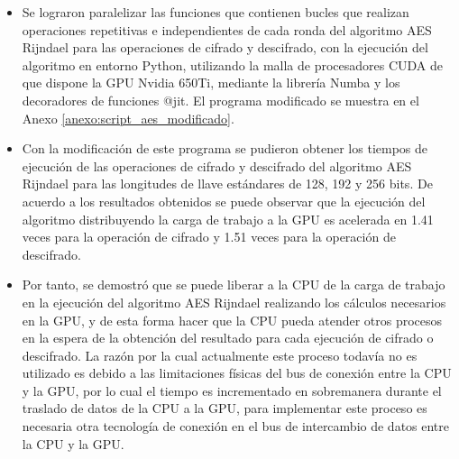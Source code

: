 \documentclass[../main/main.tex]{subfiles}
\begin{document}
\espacio

  \begin{itemize}[noitemsep,nolistsep]
    \item Se lograron paralelizar las funciones que contienen bucles que realizan operaciones repetitivas e independientes de cada ronda del algoritmo AES Rijndael para las operaciones de cifrado y descifrado, con la ejecución del algoritmo en entorno Python, utilizando la malla de procesadores CUDA de que dispone la GPU Nvidia 650Ti, mediante la librería Numba y los decoradores de funciones @jit. El programa modificado se muestra en el Anexo \ref{anexo:script_aes_modificado}.
    \item Con la modificación de este programa se pudieron obtener los tiempos de ejecución de las operaciones de cifrado y descifrado del algoritmo AES Rijndael para las longitudes de llave estándares de 128, 192 y 256 bits. De acuerdo a los resultados obtenidos se puede observar que la ejecución del algoritmo distribuyendo la carga de trabajo a la GPU es acelerada en 1.41 veces para la operación de cifrado y 1.51 veces para la operación de descifrado.
    \item Por tanto, se demostró que se puede liberar a la CPU de la carga de trabajo en la ejecución del algoritmo AES Rijndael realizando los cálculos necesarios en la GPU, y de esta forma hacer que la CPU pueda atender otros procesos en la espera de la obtención del resultado para cada ejecución de cifrado o descifrado. La razón por la cual actualmente este proceso todavía no es utilizado es debido a las limitaciones físicas del bus de conexión entre la CPU y la GPU, por lo cual el tiempo es incrementado en sobremanera durante el traslado de datos de la CPU a la GPU, para implementar este proceso es necesaria otra tecnología de conexión en el bus de intercambio de datos entre la CPU y la GPU.
  \end{itemize}
\end{document}
